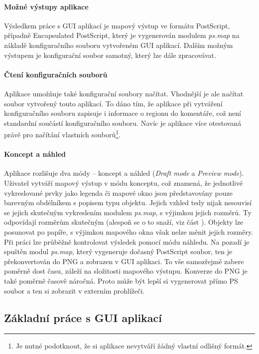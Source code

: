 \documentclass[a4paper,12pt,draft]{article}
\newcommand{\modul}[1]{\emph{#1}}
\begin{document}
\paragraph*{Možné výstupy aplikace}
Výsledkem práce s GUI aplikací je mapový výstup ve formátu PostScript, případně Encapsulated PostScript, který je vygenerován modulem \modul{ps.map} na základě konfiguračního souboru vytvořeném GUI aplikací. Dalším možným výstupem je konfigurační soubor samotný, který lze dále zpracovávat.

\paragraph*{Čtení konfiguračních souborů}
Aplikace umožňuje také konfigurační soubory načítat. Vhodnější je ale načítat soubor vytvořený touto aplikací. To dáno tím, že aplikace při vytváření konfiguračního souboru zapisuje i informace o regionu do komentáře, což není standardní součástí konfiguračního souboru. Navíc je aplikace více otestovaná právě pro načítání vlastních souborů\footnote{Je nutné podotknout, že si aplikace nevytváří žádný vlastní odlišný formát.}. 

\paragraph*{Koncept a náhled}
Aplikace rozlišuje dva módy -- koncept a náhled (\emph{Draft mode} a \emph{Preview mode}). 
Uživatel vytváří mapový výstup v módu konceptu, což znamená, že jednotlivé vykreslované prvky jako legenda či mapové okno jsou představovány pouze barevným obdélníkem s popisem typu objektu. Jejich vzhled tedy nijak nesouvisí se jejich skutečným vykreslením modulem \modul{ps.map}, s výjimkou jejich rozměrů. Ty odpovídají rozměrům skutečným (alespoň se o to snaží, viz část ). Objekty lze posunovat po papíře, s výjimkou mapového okna však nelze měnit jejich rozměry.
Při práci lze průběžně kontrolovat výsledek pomocí módu náhledu. Na pozadí je spuštěn modul \modul{ps.map}, který vygeneruje dočasný PostScript soubor, ten je překonvertován do PNG a zobrazen v GUI aplikaci. To vše samozřejmě zabere poměrně dost času, záleží na složitosti mapového výstupu. Konverze do PNG je také poměrně časově náročná. Proto může být lepší si vygenerovat přímo PS soubor a ten si zobrazit v externím prohlížeči.

\subsection{Základní práce s GUI aplikací}
\end{document}
